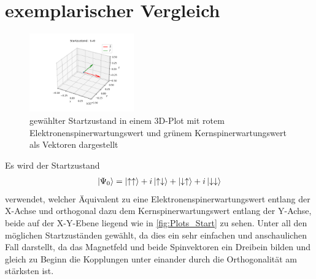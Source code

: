 \section{exemplarischer Vergleich}
\begin{figure}
    \centering
    \includegraphics[width = 0.4\textwidth]{Abbildungen/Plot_Vektor_Start.png}
    \caption{gewählter Startzustand in einem 3D-Plot mit rotem Elektronenspinerwartungswert und grünem Kernspinerwartungswert als Vektoren dargestellt}
    \label{fig:Plots_Start}
\end{figure}
Es wird der Startzustand 
\begin{align}
    \ket{\Psi_0}=\ket{\uparrow\uparrow} + i\ket{\uparrow\downarrow} + \ket{\downarrow\uparrow} + i\ket{\downarrow\downarrow}
\end{align}
verwendet, welcher Äquivalent zu eine Elektronenspinerwartungswert entlang der X-Achse und orthogonal
dazu dem Kernspinerwartungswert entlang der Y-Achse, beide auf der X-Y-Ebene liegend wie in \autoref{fig:Plots_Start} zu sehen.
Unter all den möglichen Startzuständen gewählt, da dies ein sehr einfachen und anschaulichen Fall darstellt, da das Magnetfeld und beide Spinvektoren 
ein Dreibein bilden und gleich zu Beginn die Kopplungen unter einander durch die Orthogonalität am stärksten ist.


